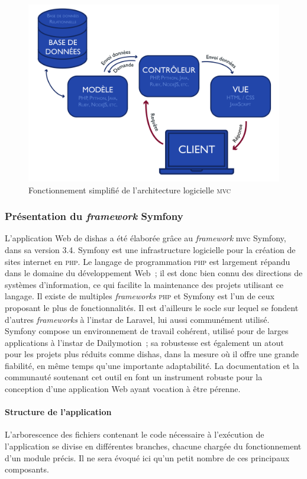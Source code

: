 \documentclass[a4paper,12pt,twoside]{book}
\newcommand{\eng}{\emph}
\newcommand{\php}{\textsc{php}\xspace}
\newcommand{\dishas}{\gls{dishas}\xspace}
\newcommand{\mvc}{\gls{mvc}\xspace}
\begin{document}
\begin{figure}[h!]
	\centering
	\includegraphics[width=14cm]{Images/Architecture-MVC.png}
	\caption{Fonctionnement simplifié de l'architecture logicielle \textsc{mvc}}
\end{figure}

			\subsubsection{Présentation du \emph{framework} Symfony}
L'application Web de \dishas a été élaborée grâce au \eng{framework} \mvc Symfony, dans sa version 3.4. Symfony est une infrastructure logicielle pour la création de sites internet en \php. Le langage de programmation \php est largement répandu dans le domaine du développement Web~; il est donc bien connu des directions de systèmes d'information, ce qui facilite la maintenance des projets utilisant ce langage. Il existe de multiples \eng{frameworks} \php et Symfony est l'un de ceux proposant le plus de fonctionnalités. Il est d'ailleurs le socle sur lequel se fondent d'autres \eng{frameworks} à l'instar de Laravel, lui aussi communément utilisé. Symfony compose un environnement de travail cohérent, utilisé pour de larges applications à l'instar de Dailymotion~; sa robustesse est également un atout pour les projets plus réduits comme \dishas, dans la mesure où il offre une grande fiabilité, en même temps qu'une importante adaptabilité. La documentation et la communauté soutenant cet outil en font un instrument robuste pour la conception d'une application Web ayant vocation à être pérenne.

				\paragraph{Structure de l'application}
L'arborescence des fichiers contenant le code nécessaire à l'exécution de l'application se divise en différentes branches, chacune chargée du fonctionnement d'un module précis. Il ne sera évoqué ici qu'un petit nombre de ces principaux composants.
\end{document}

